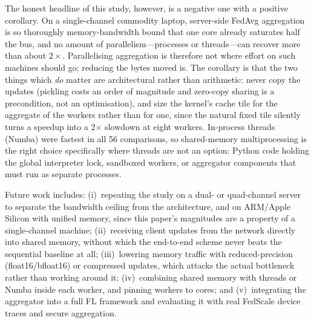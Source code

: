 \documentclass[conference]{IEEEtran}
\begin{document}
The honest headline of this study, however, is a negative one with a positive corollary. On a single-channel commodity laptop, server-side FedAvg aggregation is so thoroughly memory-bandwidth bound that one core already saturates half the bus, and no amount of parallelism---processes or threads---can recover more than about $2\times$. Parallelising aggregation is therefore not where effort on such machines should go; reducing the bytes moved is. The corollary is that the two things which \emph{do} matter are architectural rather than arithmetic: never copy the updates (pickling costs an order of magnitude and zero-copy sharing is a precondition, not an optimisation), and size the kernel's cache tile for the aggregate of the workers rather than for one, since the natural fixed tile silently turns a speedup into a 2$\times$ slowdown at eight workers. In-process threads (Numba) were fastest in all 56 comparisons, so shared-memory multiprocessing is the right choice specifically where threads are not an option: Python code holding the global interpreter lock, sandboxed workers, or aggregator components that must run as separate processes.

Future work includes: (i)~repeating the study on a dual- or quad-channel server to separate the bandwidth ceiling from the architecture, and on ARM/Apple Silicon with unified memory, since this paper's magnitudes are a property of a single-channel machine; (ii)~receiving client updates from the network directly into shared memory, without which the end-to-end scheme never beats the sequential baseline at all; (iii)~lowering memory traffic with reduced-precision (float16/bfloat16) or compressed updates, which attacks the actual bottleneck rather than working around it; (iv)~combining shared memory with threads or Numba inside each worker, and pinning workers to cores; and (v)~integrating the aggregator into a full FL framework and evaluating it with real FedScale device traces and secure aggregation.
\end{document}
